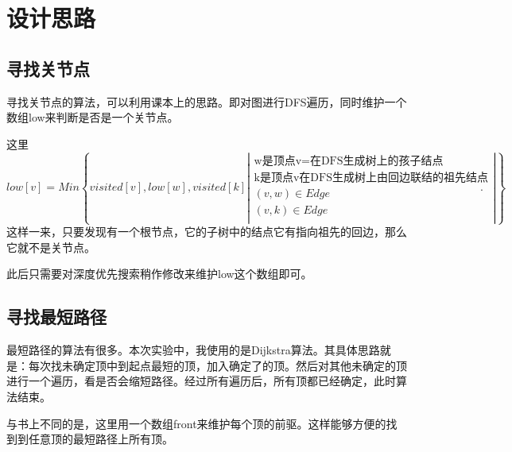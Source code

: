 \documentclass[UTF8]{article}
\begin{document}
	

	\section{设计思路}
	\subsection{寻找关节点}
	寻找关节点的算法，可以利用课本上的思路。即对图进行DFS遍历，同时维护一个数组low来判断是否是一个关节点。\par
	这里
	$$ low[v]=Min\left\{
	visited[v],low[w],visited[k]
	\left|
	\begin{array}{rcl}
	\mbox{w是顶点v=在DFS生成树上的孩子结点}\\
	\mbox{k是顶点v在DFS生成树上由回边联结的祖先结点}\\
	(v,w)\in Edge\\
	(v,k)\in Edge\\
	\end{array} 
	\right| \right\}. $$
	这样一来，只要发现有一个根节点，它的子树中的结点它有指向祖先的回边，那么它就不是关节点。\par
	此后只需要对深度优先搜索稍作修改来维护low这个数组即可。\par
	
	\subsection{寻找最短路径}
	最短路径的算法有很多。本次实验中，我使用的是Dijkstra算法。其具体思路就是：每次找未确定顶中到起点最短的顶，加入确定了的顶。然后对其他未确定的顶进行一个遍历，看是否会缩短路径。经过所有遍历后，所有顶都已经确定，此时算法结束。\par
	与书上不同的是，这里用一个数组front来维护每个顶的前驱。这样能够方便的找到到任意顶的最短路径上所有顶。\par
	
\end{document}
